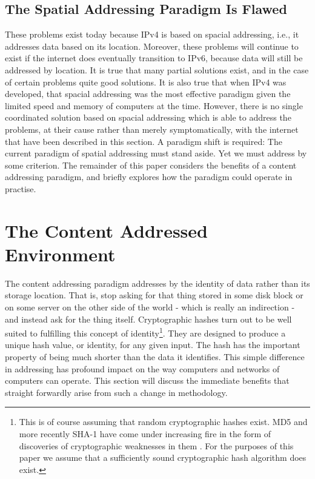 \documentclass[british,english]{article}
\begin{document}
\subsection{The Spatial Addressing Paradigm Is Flawed}

These problems exist today because IPv4 is based on spacial addressing,
i.e., it addresses data based on its location. Moreover, these problems
will continue to exist if the internet does eventually transition
to IPv6, because data will still be addressed by location. It is true
that many partial solutions exist, and in the case of certain problems
quite good solutions. It is also true that when IPv4 was developed,
that spacial addressing was the most effective paradigm given the
limited speed and memory of computers at the time. However, there
is no single coordinated solution based on spacial addressing which
is able to address the problems, at their cause rather than merely
symptomatically, with the internet that have been described in this
section. A paradigm shift is required: The current paradigm of spatial
addressing must stand aside. Yet we must address by some criterion.
The remainder of this paper considers the benefits of a content addressing
paradigm, and briefly explores how the paradigm could operate in practise.


\section{\label{sec:The-Content-Addressed}The Content Addressed Environment}

The content addressing paradigm addresses by the identity of data
rather than its storage location. That is, stop asking for that thing
stored in some disk block or on some server on the other side of the
world - which is really an indirection - and instead ask for the thing
itself. Cryptographic hashes turn out to be well suited to fulfilling
this concept of identity\footnote{This is of course assuming that random cryptographic hashes exist.
MD5 and more recently SHA-1 have come under increasing fire in the
form of discoveries of cryptographic weaknesses in them \citep{cryptoeprint:2006:360}.
For the purposes of this paper we assume that a sufficiently sound
cryptographic hash algorithm does exist.}. They are designed to produce a unique hash value, or identity, for
any given input. The hash has the important property of being much
shorter than the data it identifies. This simple difference in addressing
has profound impact on the way computers and networks of computers
can operate. This section will discuss the immediate benefits that
straight forwardly arise from such a change in methodology.
\end{document}
